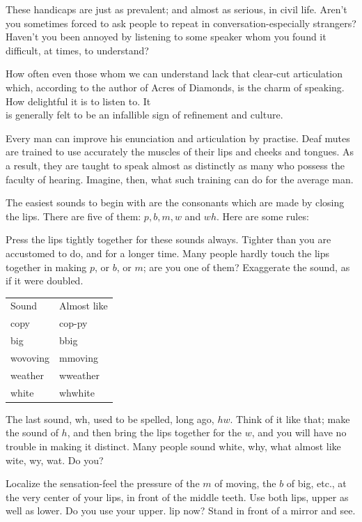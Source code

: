 \documentclass[10pt]{article}
\begin{document}
These handicaps are just as prevalent; and almost as serious, in civil life. Aren't you sometimes forced to ask people to repeat in conversation-especially strangers? Haven't you been annoyed by listening to some speaker whom you found it difficult, at times, to understand?

How often even those whom we can understand lack that clear-cut articulation which, according to the author of Acres of Diamonds, is the charm of speaking. How delightful it is to listen to. It\\
is generally felt to be an infallible sign of refinement and culture.

Every man can improve his enunciation and articulation by practise. Deaf mutes are trained to use accurately the muscles of their lips and cheeks and tongues. As a result, they are taught to speak almost as distinctly as many who possess the faculty of hearing. Imagine, then, what such training can do for the average man.

The easiest sounds to begin with are the consonants which are made by closing the lips. There are five of them: $p, b, m, w$ and $w h$. Here are some rules:

Press the lips tightly together for these sounds always. Tighter than you are accustomed to do, and for a longer time. Many people hardly touch the lips together in making $p$, or $b$, or $m$; are you one of them? Exaggerate the sound, as if it were doubled.

\begin{center}
\begin{tabular}{ll}
Sound & Almost like \\
copy & cop-py \\
big & bbig \\
wovoving & mmoving \\
weather & wweather \\
white & whwhite \\
\end{tabular}
\end{center}

The last sound, wh, used to be spelled, long ago, $h w$. Think of it like that; make the sound of $h$, and then bring the lips together for the $w$, and you will have no trouble in making it distinct. Many people sound white, why, what almost like wite, wy, wat. Do you?

Localize the sensation-feel the pressure of the $m$ of moving, the $b$ of big, etc., at the very center of your lips, in front of the middle teeth. Use both lips, upper as well as lower. Do you use your upper. lip now? Stand in front of a mirror and see.
\end{document}
